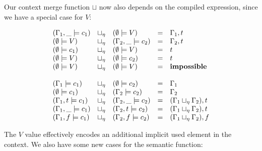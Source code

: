 \documentclass[conference]{IEEEtran}
\begin{document}
Our context merge function $\sqcup$ now also depends on the compiled expression, since we have a special case for $V$:

\begin{equation*}
    \begin{array}{l l l l l}
        (\Gamma_1,\_ \models c_1) & \sqcup_\eta & (\emptyset \models V)     & = & \Gamma_1,t                        \\
        (\emptyset \models V)     & \sqcup_\eta & (\Gamma_2,\_ \models c_2) & = & \Gamma_2,t                        \\
        (\emptyset \models c_1)   & \sqcup_\eta & (\emptyset \models V)     & = & t                                 \\
        (\emptyset \models V)     & \sqcup_\eta & (\emptyset \models c_2)   & = & t                                 \\
        (\emptyset \models V)     & \sqcup_\eta & (\emptyset \models V)     & = & \mathbf{impossible}               \\
        \\
        (\Gamma_1 \models c_1)    & \sqcup_\eta & (\emptyset \models c_2)   & = & \Gamma_1                          \\
        (\emptyset \models c_1)   & \sqcup_\eta & (\Gamma_2 \models c_2)    & = & \Gamma_2                          \\
        (\Gamma_1,t \models c_1)  & \sqcup_\eta & (\Gamma_2,\_ \models c_2) & = & (\Gamma_1 \sqcup_\eta \Gamma_2),t \\
        (\Gamma_1,\_ \models c_1) & \sqcup_\eta & (\Gamma_2,t \models c_2)  & = & (\Gamma_1 \sqcup_\eta \Gamma_2),t \\
        (\Gamma_1,f \models c_1)  & \sqcup_\eta & (\Gamma_2,f \models c_2)  & = & (\Gamma_1 \sqcup_\eta \Gamma_2),f \\
    \end{array}
\end{equation*}

The $V$ value effectively encodes an additional implicit used element in the context.
We also have some new cases for the semantic function:
\end{document}
